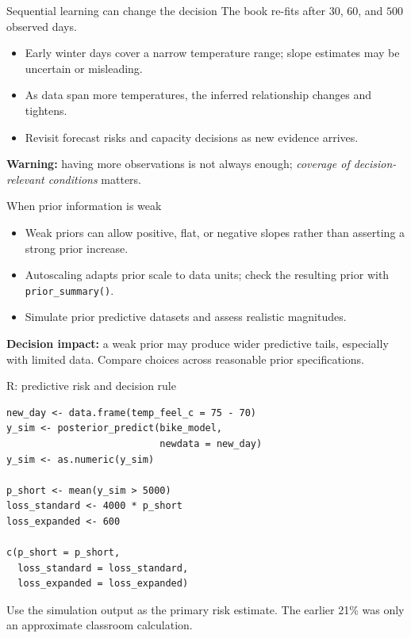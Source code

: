 \documentclass[aspectratio=43,11pt]{beamer}
\begin{document}
\begin{frame}{Sequential learning can change the decision}
The book re-fits after $30$, $60$, and $500$ observed days.
\begin{itemize}
\item Early winter days cover a narrow temperature range; slope estimates may be uncertain or misleading.
\item As data span more temperatures, the inferred relationship changes and tightens.
\item Revisit forecast risks and capacity decisions as new evidence arrives.
\end{itemize}
\par\medskip
\textbf{Warning:} having more observations is not always enough; \emph{coverage of decision-relevant conditions} matters.
\end{frame}

\begin{frame}{When prior information is weak}
\begin{itemize}
\item Weak priors can allow positive, flat, or negative slopes rather than asserting a strong prior increase.
\item Autoscaling adapts prior scale to data units; check the resulting prior with \texttt{prior\_summary()}.
\item Simulate prior predictive datasets and assess realistic magnitudes.
\end{itemize}
\par\medskip
\textbf{Decision impact:} a weak prior may produce wider predictive tails, especially with limited data. Compare choices across reasonable prior specifications.
\end{frame}

\begin{frame}[fragile]{R: predictive risk and decision rule}
\footnotesize
\begin{verbatim}
new_day <- data.frame(temp_feel_c = 75 - 70)
y_sim <- posterior_predict(bike_model,
                           newdata = new_day)
y_sim <- as.numeric(y_sim)

p_short <- mean(y_sim > 5000)
loss_standard <- 4000 * p_short
loss_expanded <- 600

c(p_short = p_short,
  loss_standard = loss_standard,
  loss_expanded = loss_expanded)
\end{verbatim}
\scriptsize Use the simulation output as the primary risk estimate. The earlier 21\% was only an approximate classroom calculation.
\end{frame}
\end{document}
